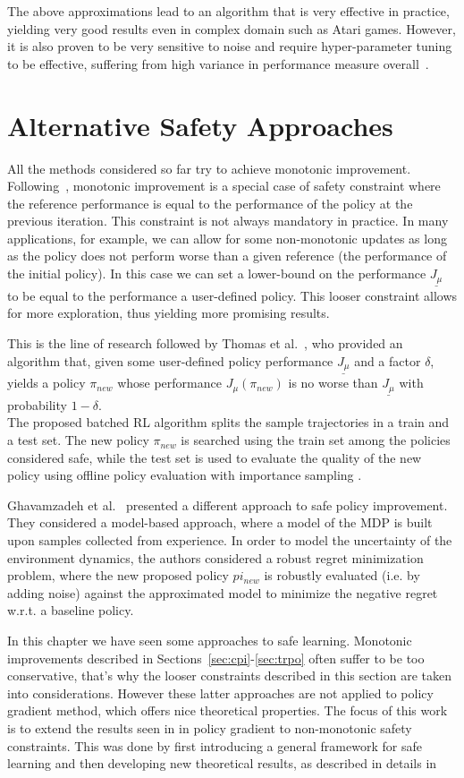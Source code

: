 The above approximations lead to an algorithm that is very effective in practice, yielding very good results even in complex domain such as Atari games. However, it is also proven to be very sensitive to noise and require hyper-parameter tuning to be effective, suffering from high variance in performance measure overall~\cite{2017arXiv170804133I}.

\section{Alternative Safety Approaches}
\label{sec:other-safe}
All the methods considered so far try to achieve monotonic improvement. Following~, monotonic improvement is a special case of safety constraint where the reference performance is equal to the performance of the policy at the previous iteration. This constraint is not always mandatory in practice. In many applications, for example, we can allow for some non-monotonic updates as long as the policy does not perform worse than a given reference (\eg the performance of the initial policy). In this case we can set a lower-bound on the performance $\underline{J_\mu}$ to be equal to the performance a user-defined policy. This looser constraint allows for more exploration, thus yielding more promising results. 

This is the line of research followed by Thomas et al.~\cite{pmlr-v37-thomas15}, who provided an algorithm that, given some user-defined policy performance $\underline{J_\mu}$ and a factor $\delta$, yields a policy $\pi_{new}$ whose performance $J_\mu(\pi_{new})$ is no worse than $\underline{J_\mu}$ with probability $1-\delta$.\\
The proposed batched RL algorithm splits the sample trajectories in a train and a test set. The new policy $\pi_{new}$ is searched using the train set among the policies considered safe, while the test set is used to evaluate the quality of the new policy using offline policy evaluation with importance sampling \cite{Precup:2000:ETO:645529.658134}. 

Ghavamzadeh et al.~\cite{Petrik:2016:SPI:3157096.3157354} presented a different approach to safe policy improvement. They considered a model-based approach, where a model of the MDP is built upon samples collected from experience. In order to model the uncertainty of the environment dynamics, the authors considered a robust regret minimization problem, where the new proposed policy $pi_{new}$ is robustly evaluated (i.e. by adding noise) against the approximated model to minimize the negative regret w.r.t. a baseline policy. 

In this chapter we have seen some approaches to safe learning. Monotonic improvements described in Sections~\ref{sec:cpi}-\ref{sec:trpo} often suffer to be too conservative, that's why the looser constraints described in this section are taken into considerations. However these latter approaches are not applied to policy gradient method, which offers nice theoretical properties. The focus of this work is to extend the results seen in  in policy gradient to non-monotonic safety constraints. This was done by first introducing a general framework for safe learning and then developing new theoretical results, as described in details in 
